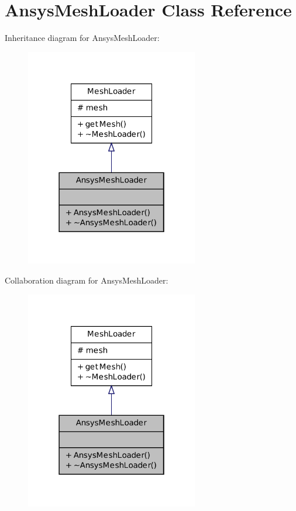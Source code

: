 \hypertarget{class_ansys_mesh_loader}{
\section{AnsysMeshLoader Class Reference}
\label{class_ansys_mesh_loader}
}


Inheritance diagram for AnsysMeshLoader:
\nopagebreak
\begin{figure}[H]
\begin{center}
\leavevmode
\includegraphics[width=214pt]{class_ansys_mesh_loader__inherit__graph}
\end{center}
\end{figure}


Collaboration diagram for AnsysMeshLoader:
\nopagebreak
\begin{figure}[H]
\begin{center}
\leavevmode
\includegraphics[width=214pt]{class_ansys_mesh_loader__coll__graph}
\end{center}
\end{figure}
